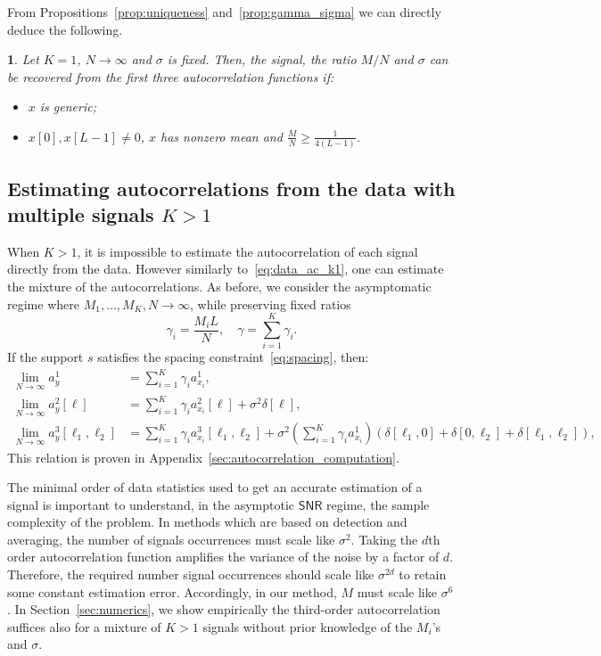 \documentclass[english,11pt]{article}
\newcommand{\TODO}[1]{{\color{red}{[#1]}}}
\numberwithin{equation}{section}
\theoremstyle{plain}
\theoremstyle{definition}
\theoremstyle{remark}
\theoremstyle{plain}
\theoremstyle{remark}
\theoremstyle{plain}
\newtheorem{corollary}[thm]{\protect\corollaryname}
\theoremstyle{plain}
\providecommand{\corollaryname}{Corollary}
\newcommand{\SNR}{{\textsf{SNR}}}
\begin{document}
From Propositions~\ref{prop:uniqueness} and~\ref{prop:gamma_sigma} we can directly deduce the following.
\begin{corollary}
	Let $K=1$, $N\to\infty$ and $\sigma$ is fixed. Then, the signal, the ratio $M/N$ and $\sigma$ can be recovered from the first three autocorrelation functions if:
	\begin{itemize}
		\item $x$ is generic;
		\item  $x[0],x[L-1]\neq 0$, $x$ has nonzero mean and $\frac{M}{N}\geq\frac{1}{4(L-1)}$.
	\end{itemize}
\end{corollary}
 
 
\subsection{Estimating autocorrelations from the data with multiple signals $K>1$} \label{sec:estimating_ac}

When $K>1$, it is impossible to estimate the autocorrelation of each signal directly from the data. However similarly to~\eqref{eq:data_ac_k1}, one can estimate the mixture of the autocorrelations. 
As before, we consider  the asymptomatic regime where $M_1,\ldots,M_K,N\to\infty$, while preserving fixed ratios
\begin{equation}
\gamma_i = \frac{M_i L}{N}, \quad \gamma = \sum_{i=1}^K\gamma_i.
\end{equation}
If the support $s$ satisfies the spacing constraint~\eqref{eq:spacing}, then:
\begin{align} \label{eq:data_ac}
\lim_{N\to\infty} a_y^1 &= \sum_{i=1}^K\gamma_i a_{x_i}^1, \nonumber\\
\lim_{N\to\infty} a_y^2[\ell] &= \sum_{i=1}^K\gamma_i a_{x_i}^2[\ell] +\sigma^2\delta[\ell],\\
\lim_{N\to\infty} a_y^3[\ell_1,\ell_2] &= \sum_{i=1}^K\gamma_i a_{x_i}^3[\ell_1,\ell_2] + \sigma^2\left(\sum_{i=1}^K\gamma_i a_{x_i}^1\right)(\delta[\ell_1,0]+\delta[0,\ell_2]+\delta[\ell_1,\ell_2]), \nonumber
\end{align}
This relation is proven in  Appendix~\ref{sec:autocorrelation_computation}.

The minimal order of data statistics used to get an accurate estimation of a signal is important to understand, in the asymptotic $\SNR$ regime, the sample complexity of the problem.
In methods which are based on detection and averaging, the number of signals occurrences  must scale like $\sigma^2$. Taking the $d$th order autocorrelation function amplifies the variance of the noise by a factor of $d$. Therefore, the required number signal occurrences should scale like $\sigma^{2d}$  to retain some constant estimation error. Accordingly, in our  method, $M$ must scale like $\sigma^6$. In Section~\ref{sec:numerics}, we show empirically the third-order autocorrelation suffices also for a mixture of $K>1$ signals without prior knowledge of the $M_i$'s and $\sigma$.  \TODO{question mark on the entire paragraph}
\end{document}
